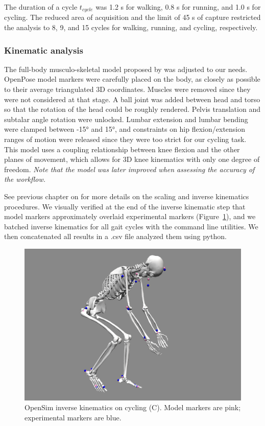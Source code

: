 The duration of a cycle \(t_{cycle}\) was 1.2 s for walking, 0.8 s for running, and 1.0 s for cycling. The reduced area of acquisition and the limit of 45 s of capture restricted the analysis to 8, 9, and 15 cycles for walking, running, and cycling, respectively.


\subsubsection{Kinematic analysis}

The full-body musculo-skeletal model proposed by \cite{Rajagopal2016} was adjusted to our needs. OpenPose model markers were carefully placed on the body, as closely as possible to their average triangulated 3D coordinates. Muscles were removed since they were not considered at that stage. A ball joint was added between head and torso so that the rotation of the head could be roughly rendered. Pelvis translation and subtalar angle rotation were unlocked. Lumbar extension and lumbar bending were clamped between -15° and 15°, and constraints on hip flexion/extension ranges of motion were released since they were too strict for our cycling task. This model uses a coupling relationship between knee flexion and the other planes of movement, which allows for 3D knee kinematics with only one degree of freedom. \textit{Note that the model was later improved when assessing the accuracy of the workflow.}

See previous chapter on  for more details on the scaling and inverse kinematics procedures. We visually verified at the end of the inverse kinematic step that model markers approximately overlaid experimental markers (Figure~\ref{fig_opensim}), and we batched inverse kinematics for all gait cycles with the command line utilities. We then concatenated all results in a .csv file analyzed them using python.

\begin{figure}[!ht]
	\centering
	\def\svgwidth{1\columnwidth}
	\fontsize{10pt}{10pt}\selectfont
	\includegraphics[width=\linewidth]{"../Chap4/Figures/Fig_OpenSim.png"}
	\caption{OpenSim inverse kinematics on cycling (C). Model markers are pink; experimental markers are blue.}
	\label{fig_opensim}
\end{figure}

